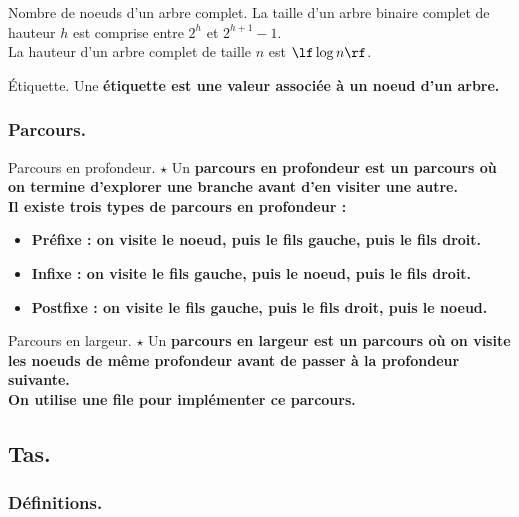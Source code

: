 \documentclass[french, 11pt]{article}
\begin{document}
\begin{corr}{Nombre de noeuds d'un arbre complet.}{}
    La taille d'un arbre binaire complet de hauteur $h$ est comprise entre $2^h$ et $2^{h+1}-1$.\\
    La hauteur d'un arbre complet de taille $n$ est $\lf\log n\rf$.
\end{corr}

\begin{defi}{Étiquette.}{}
    Une \bf{étiquette} est une valeur associée à un noeud d'un arbre.
\end{defi}

\subsubsection{Parcours.}

\begin{defi}{Parcours en profondeur. $\star$}{}
    Un \bf{parcours en profondeur} est un parcours où on termine d'explorer une branche avant d'en visiter une autre.\\
    Il existe trois types de parcours en profondeur :
    \begin{itemize}[topsep=0pt,itemsep=-0.9 ex]
        \item \bf{Préfixe} : on visite le noeud, puis le fils gauche, puis le fils droit.
        \item \bf{Infixe} : on visite le fils gauche, puis le noeud, puis le fils droit.
        \item \bf{Postfixe} : on visite le fils gauche, puis le fils droit, puis le noeud.
    \end{itemize}
\end{defi}

\begin{defi}{Parcours en largeur. $\star$}{}
    Un \bf{parcours en largeur} est un parcours où on visite les noeuds de même profondeur avant de passer à la profondeur suivante.\\
    On utilise une file pour implémenter ce parcours.
\end{defi}

\subsection{Tas.}

\subsubsection{Définitions.}
\end{document}
